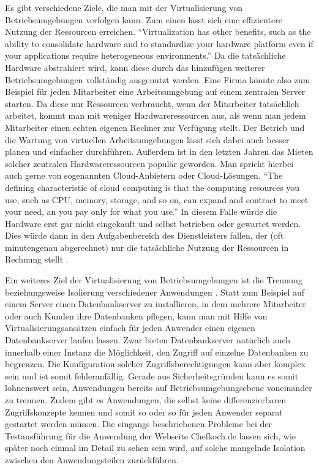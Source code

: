 Es gibt verschiedene Ziele, die man mit der Virtualisierung von Betriebsumgebungen verfolgen kann. Zum einen lässt sich eine effizientere Nutzung der Ressourcen erreichen. "`Virtualization has other benefits, such as the ability to consolidate hardware and to standardize your hardware platform even if your applications require heterogeneous environments."' \citep[S.][S. 53]{HumFar10} Da die tatsächliche Hardware abstrahiert wird, kann diese durch das hinzufügen weiterer Betriebsumgebungen vollständig ausgenutzt werden. Eine Firma könnte also zum Beispiel für jeden Mitarbeiter eine Arbeitsumgebung auf einem zentralen Server starten. Da diese nur Ressourcen verbraucht, wenn der Mitarbeiter tatsächlich arbeitet, kommt man mit weniger Hardwareressourcen aus, als wenn man jedem Mitarbeiter einen echten eigenen Rechner zur Verfügung stellt. Der Betrieb und die Wartung von virtuellen Arbeitsumgebungen lässt sich dabei auch besser planen und einfacher durchführen. Außerdem ist in den letzten Jahren das Mieten solcher zentralen Hardwareressourcen populär geworden. Man spricht hierbei auch gerne von sogenannten Cloud-Anbietern oder Cloud-Lösungen. "`The defining characteristic of cloud computing is that the computing resources you use, such as CPU, memory, storage, and so on, can expand and contract to meet your need, an you pay only for what you use."' \citep[S.][S. 312]{HumFar10} In diesem Falle würde die Hardware erst gar nicht eingekauft und selbst betrieben oder gewartet werden. Dies würde dann in den Aufgabenbereich des Dienstleisters fallen, der (oft minutengenau abgerechnet) nur die tatsächliche Nutzung der Ressourcen in Rechnung stellt \citep[Vgl.][S. 7]{ZhaChe14}.

Ein weiteres Ziel der Virtualisierung von Betriebsumgebungen ist die Trennung beziehungsweise Isolierung verschiedener Anwendungen \citep[Vgl.][Abstract]{Schee14}. Statt zum Beispiel auf einem Server einen Datenbankserver zu installieren, in dem mehrere Mitarbeiter oder auch Kunden ihre Datenbanken pflegen, kann man mit Hilfe von Virtualisierungsansätzen einfach für jeden Anwender einen eigenen Datenbankserver laufen lassen. Zwar bieten Datenbankserver natürlich auch innerhalb einer Instanz die Möglichkeit, den Zugriff auf einzelne Datenbanken zu begrenzen. Die Konfiguration solcher Zugriffsberechtigungen kann aber komplex sein und ist somit fehleranfällig. Gerade aus Sicherheitsgründen kann es somit lohnenswert sein, Anwendungen bereits auf Betriebsumgebungsebene voneinander zu trennen. Zudem gibt es Anwendungen, die selbst keine differenzierbaren Zugriffskonzepte kennen und somit so oder so für jeden Anwender separat gestartet werden müssen. Die eingangs beschriebenen Probleme bei der Testausführung für die Anwendung der Webseite Chefkoch.de lassen sich, wie später noch einmal im Detail zu sehen sein wird, auf solche mangelnde Isolation zwischen den Anwendungsteilen zurückführen.

